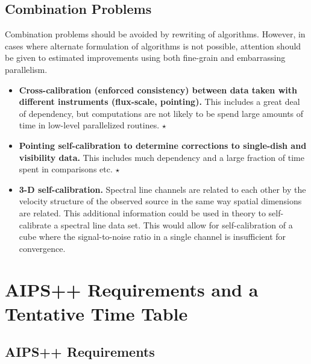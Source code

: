\subsection{Combination Problems}

Combination problems should be avoided by rewriting of algorithms.
However, in cases where alternate formulation of algorithms is not
possible, attention should be given to estimated improvements using
both fine-grain and embarrassing parallelism.

\begin{itemize}

\item {\bf Cross-calibration (enforced consistency) between data taken
with different instruments (flux-scale, pointing).}  This includes a
great deal of dependency, but computations are not likely to be spend
large amounts of time in low-level parallelized routines. $\star$

\item {\bf Pointing self-calibration to determine corrections to
single-dish and visibility data.}  This includes much dependency and a
large fraction of time spent in comparisons etc. $\star$

\item {\bf 3-D self-calibration.}  Spectral line channels are related
to each other by the velocity structure of the observed source in the
same way spatial dimensions are related.  This additional information
could be used in theory to self-calibrate a spectral line data set.
This would allow for self-calibration of a cube where the
signal-to-noise ratio in a single channel is insufficient for
convergence.

\end{itemize}

\section{AIPS++ Requirements and a Tentative Time Table}

\subsection{AIPS++ Requirements}

